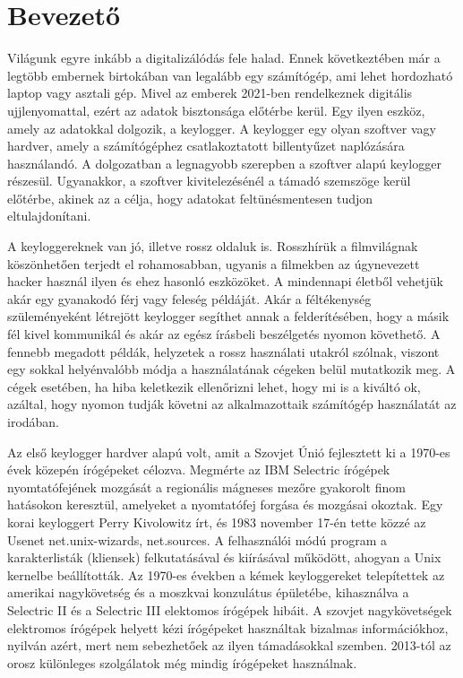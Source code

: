 \documentclass[12pt,a4paper,oneside]{report}
\begin{document}
 




%




\renewcommand{\contentsname}{Tartalomjegyzék}
\tableofcontents\vfill
\thispagestyle{empty}
\cleardoublepage


\hyphenchar{}
\sloppy

\chapter{Bevezető}\label{sec:intro}
Világunk egyre inkább a digitalizálódás fele halad. Ennek következtében már a legtöbb embernek birtokában van legalább egy számítógép, ami lehet hordozható laptop vagy asztali gép. Mivel az emberek 2021-ben rendelkeznek digitális ujjlenyomattal, ezért az adatok bisztonsága előtérbe kerül. Egy ilyen eszköz, amely az adatokkal dolgozik, a keylogger. A keylogger egy olyan szoftver vagy hardver, amely a számítógéphez csatlakoztatott billentyűzet naplózására használandó. A dolgozatban a legnagyobb szerepben a szoftver alapú keylogger részesül. Ugyanakkor, a szoftver kivitelezésénél a támadó szemszöge kerül előtérbe, akinek az a célja, hogy adatokat feltünésmentesen tudjon eltulajdonítani.

A keyloggereknek van jó, illetve rossz oldaluk is. Rosszhírük a filmvilágnak köszönhetően terjedt el rohamosabban, ugyanis a filmekben az úgynevezett hacker használ ilyen és ehez hasonló eszközöket. A mindennapi életből vehetjük akár egy gyanakodó férj vagy feleség példáját. Akár a féltékenység szüleményeként létrejött keylogger segíthet annak a felderítésében, hogy a másik fél kivel kommunikál és akár az egész írásbeli beszélgetés nyomon követhető. A fennebb megadott példák, helyzetek a rossz használati utakról szólnak, viszont egy sokkal helyénvalóbb módja a használatának cégeken belül mutatkozik meg. A cégek esetében, ha hiba keletkezik ellenőrizni lehet, hogy mi is a kiváltó ok, azáltal, hogy nyomon tudják követni az alkalmazottaik számítógép használatát az irodában.

Az első keylogger hardver alapú volt, amit a Szovjet Únió fejlesztett ki a 1970-es évek közepén írógépeket célozva. Megmérte az IBM Selectric írógépek nyomtatófejének mozgását a regionális mágneses mezőre gyakorolt finom hatásokon keresztül, amelyeket a nyomtatófej forgása és mozgásai okoztak. Egy korai keyloggert Perry Kivolowitz írt, és 1983 november 17-én tette közzé az Usenet net.unix-wizards, net.sources. A felhasználói módú program a karakterlisták (kliensek) felkutatásával és kiírásával működött, ahogyan a Unix kernelbe beállították. Az 1970-es években a kémek keyloggereket telepítettek az amerikai nagykövetség és a moszkvai konzulátus épületébe, kihasználva a Selectric II és a Selectric III elektomos írógépek hibáit. A szovjet nagykövetségek elektromos írógépek helyett kézi írógépeket használtak bizalmas információkhoz, nyilván azért, mert nem sebezhetőek az ilyen támadásokkal szemben. 2013-tól az orosz különleges szolgálatok még mindig írógépeket használnak.
\end{document}
